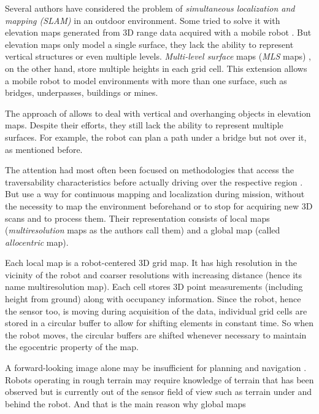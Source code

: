 \documentclass[12pt,a4paper,table,dvipsnames,tikz]{report}
\newcommand{\term}{\textit}
\newcommand{\acronym}{\MakeUppercase}
\begin{document}
	Several authors have considered the problem of \term{simultaneous localization 
	and mapping (\acronym{slam})} in an outdoor environment. Some tried to solve it 
	with elevation maps generated from \acronym{3d} range data acquired with a mobile 
	robot \citep{Pfaff}. But elevation maps only model a single surface, they lack the 
	ability to represent vertical structures or even multiple levels. \term{Multi-level 
	surface} maps (\term{\acronym{mls}} maps) \citep{Triebel}, on the other hand, store 
	multiple heights in each grid cell. This extension allows a mobile robot to model 
	environments with more than one surface, such as bridges, underpasses, buildings 
	or mines. 
	\par
	The approach of \citet{Pfaff} allows to deal with vertical and 
	overhanging objects in elevation maps. Despite their efforts, they still lack 
	the ability to represent multiple surfaces. For example, the robot can plan a 
	path under a bridge but not over it, as mentioned before.
	\par
	The attention had most often been focused on methodologies that access the 
	traversability characteristics before actually driving over the respective region 
	\citep{Papadakis}. But \citet{Droeschel} use a way for continuous mapping and 
	localization during mission, without the necessity to map the environment 
	beforehand or to stop for acquiring new \acronym{3d} scans and to process them. 
	Their representation consists of local maps (\term{multiresolution} maps as the 
	authors call them) and a global map (called \term{allocentric} map).
	\par
	Each local map is a robot-centered \acronym{3d} grid map. It has high resolution 
	in the vicinity of the robot and coarser resolutions with increasing distance 
	(hence its name multiresolution map). Each cell stores \acronym{3d} point 
	measurements (including height from ground) along with occupancy information. 
	Since the robot, hence the sensor too, is moving during acquisition of the data, 
	individual grid cells are stored in a circular buffer to allow for shifting 
	elements in constant time. So when the robot moves, the circular buffers are 
	shifted whenever necessary to maintain the egocentric property of the map.
	\par
	A forward-looking image alone may be insufficient for planning and navigation 
	\citep{Kweon}. Robots operating in rough terrain may require knowledge of terrain 
	that has been observed but is currently out of the sensor field of view such as 
	terrain under and behind the robot. And that is the main reason why global maps 
\end{document}
